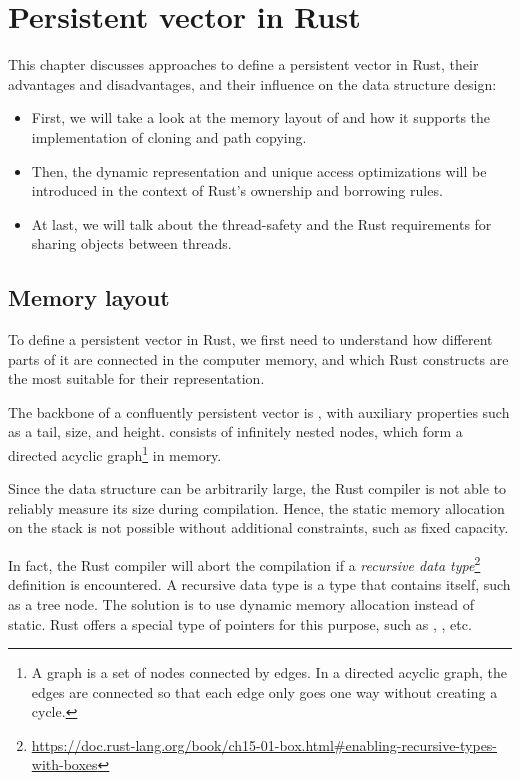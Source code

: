 \newcommand{\boxptr}{\type{box}}

\chapter{Persistent vector in Rust}

This chapter discusses approaches to define a persistent vector in Rust, their advantages and disadvantages, and their influence on the data structure design:

\begin{itemize}
    \item First, we will take a look at the memory layout of \rrbtree{} and how it supports the implementation of cloning and path copying.
    \item Then, the dynamic representation and unique access optimizations will be introduced in the context of Rust's ownership and borrowing rules.
    \item At last, we will talk about the thread-safety and the Rust requirements for sharing objects between threads.
\end{itemize}

\section{Memory layout}
To define a persistent vector in Rust, we first need to understand how different parts of it are connected in the computer memory, and which Rust constructs are the most suitable for their representation.

The backbone of a confluently persistent vector is \rrbtree{}, with auxiliary properties such as a tail, size, and height. \rrbtree{} consists of infinitely nested nodes, which form a directed acyclic graph\footnote{A graph is a set of nodes connected by edges. In a directed acyclic graph, the edges are connected so that each edge only goes one way without creating a cycle.} in memory.

Since the data structure can be arbitrarily large, the Rust compiler is not able to reliably measure its size during compilation. Hence, the static memory allocation on the stack is not possible without additional constraints, such as fixed capacity.

In fact, the Rust compiler will abort the compilation if a \emph{recursive data type}\footnote{\url{https://doc.rust-lang.org/book/ch15-01-box.html\#enabling-recursive-types-with-boxes}} definition is encountered. A recursive data type is a type that contains itself, such as a tree node. The solution is to use dynamic memory allocation instead of static. Rust offers a special type of pointers for this purpose, such as \boxptr{}, \rc{}, etc.

